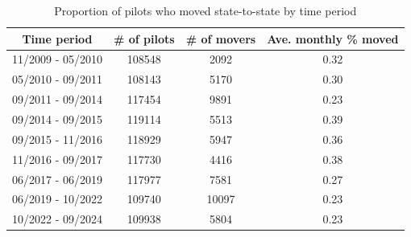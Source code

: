 \begin{table}[ht]
\centering
\begin{tabular}{cccc}
  \hline
Time period & \# of pilots & \# of movers & Ave. monthly \% moved \\ 
  \hline
11/2009 - 05/2010 & 108548 & 2092 & 0.32 \\ 
  05/2010 - 09/2011 & 108143 & 5170 & 0.30 \\ 
  09/2011 - 09/2014 & 117454 & 9891 & 0.23 \\ 
  09/2014 - 09/2015 & 119114 & 5513 & 0.39 \\ 
  09/2015 - 11/2016 & 118929 & 5947 & 0.36 \\ 
  11/2016 - 09/2017 & 117730 & 4416 & 0.38 \\ 
  06/2017 - 06/2019 & 117977 & 7581 & 0.27 \\ 
  06/2019 - 10/2022 & 109740 & 10097 & 0.23 \\ 
  10/2022 - 09/2024 & 109938 & 5804 & 0.23 \\ 
   \hline
\end{tabular}
\caption{Proportion of pilots who moved state-to-state by time period} 
\end{table}
